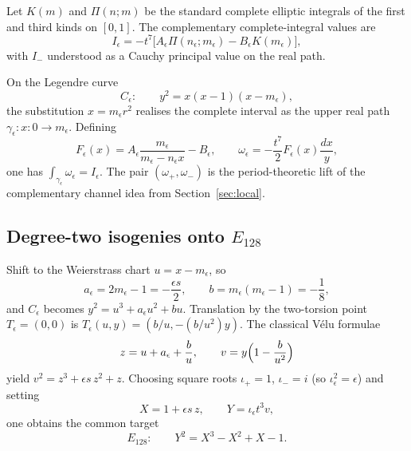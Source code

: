 \documentclass[11pt,a4paper]{article}
\theoremstyle{definition}
\theoremstyle{remark}
\begin{document}
Let \(K(m)\) and \(\Pi(n;m)\) be the standard complete elliptic integrals of the
first and third kinds on \([0,1]\). The complementary complete-integral values
are
\begin{equation}
I_\epsilon
=
-t^7\bigl[
A_\epsilon\Pi(n_\epsilon;m_\epsilon)-B_\epsilon K(m_\epsilon)
\bigr],
\label{eq:Ieps}
\end{equation}
with \(I_-\) understood as a Cauchy principal value on the real path.

On the Legendre curve
\begin{equation}
C_\epsilon:\qquad y^2=x(x-1)(x-m_\epsilon),
\label{eq:Ceps}
\end{equation}
the substitution \(x=m_\epsilon r^2\) realises the complete interval as the upper
real path \(\gamma_\epsilon:x\colon0\to m_\epsilon\). Defining
\begin{equation}
F_\epsilon(x)
=
A_\epsilon\frac{m_\epsilon}{m_\epsilon-n_\epsilon x}-B_\epsilon,
\qquad
\omega_\epsilon
=
-\frac{t^7}{2}F_\epsilon(x)\frac{dx}{y},
\label{eq:omega}
\end{equation}
one has \(\int_{\gamma_\epsilon}\omega_\epsilon=I_\epsilon\). The pair
\((\omega_+,\omega_-)\) is the period-theoretic lift of the complementary
channel idea from Section~\ref{sec:local}.

\subsection{Degree-two isogenies onto \(E_{128}\)}

Shift to the Weierstrass chart \(u=x-m_\epsilon\), so
\[
a_\epsilon=2m_\epsilon-1=-\frac{\epsilon s}{2},
\qquad
b=m_\epsilon(m_\epsilon-1)=-\frac18,
\]
and \(C_\epsilon\) becomes \(y^2=u^3+a_\epsilon u^2+bu\). Translation by the
two-torsion point \(T_\epsilon=(0,0)\) is
\(T_\epsilon(u,y)=(b/u,-(b/u^2)y)\). The classical V\'elu formulae
\begin{equation}
z=u+a_\epsilon+\frac{b}{u},
\qquad
v=y\Bigl(1-\frac{b}{u^2}\Bigr)
\label{eq:velu}
\end{equation}
yield \(v^2=z^3+\epsilon s\,z^2+z\). Choosing square roots
\(\iota_+ =1\), \(\iota_-=i\) (so \(\iota_\epsilon^2=\epsilon\)) and setting
\begin{equation}
X=1+\epsilon s\,z,
\qquad
Y=\iota_\epsilon t^3 v,
\label{eq:XY}
\end{equation}
one obtains the common target
\begin{equation}
E_{128}:\qquad Y^2=X^3-X^2+X-1.
\label{eq:E128}
\end{equation}
\end{document}
